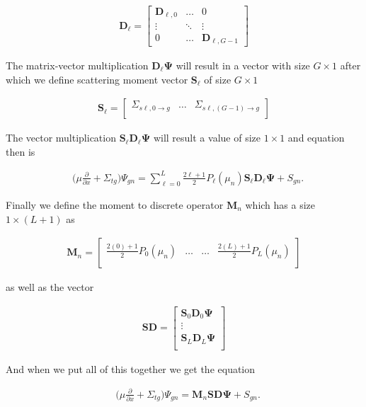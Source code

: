 \documentclass[11pt,letterpaper,titlepage]{article}
\newcommand{\stimes}{{\times}}
\numberwithin{equation}{section}
\newcommand{\beq}{\begin{equation*}
\begin{aligned}}
\newcommand{\eeq}{\end{aligned}
\end{equation*}}
\begin{document}
\beq 
\mathbf{D}_{\ell}  = 
\begin{bmatrix}
\mathbf{D}_{\ell,0}  & \hdots & 0 \\
\vdots &\ddots &\vdots \\
0 & \hdots &\mathbf{D}_{\ell,G-1} 
\end{bmatrix}
\eeq 


The matrix-vector multiplication $\mathbf{D}_\ell \mathbf{\Psi}$ will result in a vector with size $G\stimes 1$ after which we define scattering moment vector $\mathbf{S}_\ell$ of size $G\stimes 1$

\beq
\mathbf{S}_\ell= 
\begin{bmatrix}
\Sigma_{s\ell,0{\to}g} &\hdots &\Sigma_{s\ell,(G-1){\to}g} \\
\end{bmatrix}
\eeq 

The vector multiplication $\mathbf{S}_\ell \mathbf{D}_\ell \mathbf{\Psi}$ will result a value of size $1\stimes 1$ and equation then is

\begin{equation} 
\begin{aligned}
&\biggr(\mu\frac{\partial}{\partial x} +\Sigma_{tg} \biggr)  \Psi_{gn}
= \sum_{\ell=0}^{L}\frac{2\ell+1}{2}P_\ell(\mu_n)
\mathbf{S}_\ell \mathbf{D}_\ell \mathbf{\Psi}
+  S_{gn}.
\end{aligned}
\end{equation}

Finally we define the moment to discrete operator $\mathbf{M}_n$ which has a size $1\stimes (L+1)$ as

\beq
\mathbf{M}_n = 
\begin{bmatrix}
\frac{2(0)+1}{2} P_0(\mu_n) &\hdots &\hdots &\frac{2(L)+1}{2} P_L(\mu_n)\\
\end{bmatrix}
\eeq 

as well as the vector

\beq 
\mathbf{SD}  = 
\begin{bmatrix}
\mathbf{S}_0 \mathbf{D}_0 \mathbf{\Psi}\\
\vdots \\
\mathbf{S}_L \mathbf{D}_L \mathbf{\Psi}\\
\end{bmatrix}
\eeq 

And when we put all of this together we get the equation

\begin{equation} 
\begin{aligned}
&\biggr(\mu\frac{\partial}{\partial x} +\Sigma_{tg} \biggr)  \Psi_{gn}
= \mathbf{M}_n
\mathbf{S} \mathbf{D} \mathbf{\Psi}
+  S_{gn}.
\end{aligned}
\end{equation}
\end{document}
